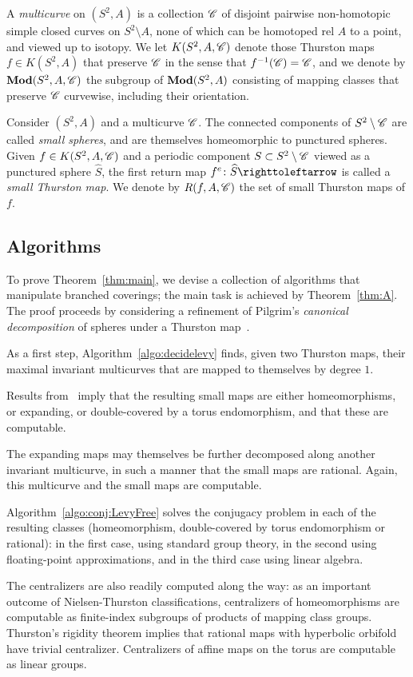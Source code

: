 \documentclass{amsart}
\begin{document}
A \emph{multicurve} on $(S^2,A)$ is a collection ${\mathscr C}$ of disjoint
pairwise non-homotopic simple closed curves on $S^2\setminus A$, none
of which can be homotoped rel $A$ to a point, and viewed up to
isotopy.  We let $K(S^2,A,{\mathscr C})$ denote those Thurston maps
$f\in K(S^2,A)$ that preserve ${\mathscr C}$ in the sense that
$f^{-1}({\mathscr C})= {\mathscr C}$, and we denote by $\mathbf{\relax Mod}(S^2,A,{\mathscr C})$ the
subgroup of $\mathbf{\relax Mod}(S^2,A)$ consisting of mapping classes that preserve
${\mathscr C}$ curvewise, including their orientation.

Consider $(S^2,A)$ and a multicurve ${\mathscr C}$. The connected components of
$S^2\setminus{\mathscr C}$ are called \emph{small spheres}, and are themselves
homeomorphic to punctured spheres.  Given $f\in K(S^2,A,{\mathscr C})$ and a
periodic component $S\subset S^2\setminus{\mathscr C}$ viewed as a punctured
sphere $\widehat S$, the first return map
$f^e\colon \widehat S\selfmap$ is called a \emph{small Thurston
  map}. We denote by $R(f,A,{\mathscr C})$ the set of small Thurston maps of
$f$.

\subsection{Algorithms}
To prove Theorem~\ref{thm:main}, we devise a collection of algorithms
that manipulate branched coverings; the main task is achieved by
Theorem~\ref{thm:A}. The proof proceeds by considering a refinement of
Pilgrim's \emph{canonical decomposition} of spheres under a Thurston
map~\cite{pilgrim:combinations}.

As a first step, Algorithm~\ref{algo:decidelevy} finds, given two
Thurston maps, their maximal invariant multicurves that are mapped to
themselves by degree $1$.

Results from~\cite{bartholdi-dudko:bc4} imply that the resulting
small maps are either homeomorphisms, or expanding, or double-covered
by a torus endomorphism, and that these are computable.

The expanding maps may themselves be further decomposed along another
invariant multicurve, in such a manner that the small maps are
rational. Again, this multicurve and the small maps are computable.

Algorithm~\ref{algo:conj:LevyFree} solves the conjugacy problem in
each of the resulting classes (homeomorphism, double-covered by torus
endomorphism or rational): in the first case, using standard group
theory, in the second using floating-point approximations, and in the
third case using linear algebra.

The centralizers are also readily computed along the way: as an
important outcome of Nielsen-Thurston classifications, centralizers of
homeomorphisms are computable as finite-index subgroups of products of
mapping class groups. Thurston's rigidity theorem implies that
rational maps with hyperbolic orbifold have trivial
centralizer. Centralizers of affine maps on the torus are computable
as linear groups.
\end{document}
